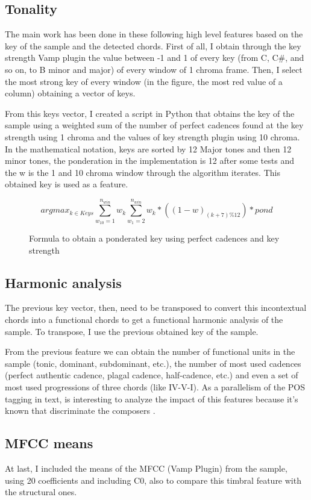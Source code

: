 \documentclass{article}
\begin{document}
\subsection{Tonality}\label{subsec:chord_windows}
The main work has been done in these following high level features based on the key of the sample and the detected chords. First of all, I obtain through the key strength Vamp plugin the value between -1 and 1 of every key (from C, C\#, and so on, to B minor and major) of every window of 1 chroma frame. Then, I select the most strong key of every window (in the figure, the most red value of a column) obtaining a vector of keys.

From this keys vector, I created a script in Python that obtains the key of the sample using a weighted sum of the number of perfect cadences found at the key strength using 1 chroma and the values of key strength plugin using 10 chroma. In the mathematical notation, keys are sorted by 12 Major tones and then 12 minor tones, the ponderation in the implementation is 12 after some tests and the w is the 1 and 10 chroma window through the algorithm iterates. This obtained key is used as a feature.

\begin{figure}
\[ argmax_{k \in Keys} \sum_{w_{10}=1}^{n_{win}} w_k \sum_{w_{1}=2}^{n_{win}} w_k * ((1-w)_{(k+7)\%12})*pond \]
\caption{Formula to obtain a ponderated key using perfect cadences and key strength} \label{fig:keyFormula}
\end{figure}


\subsection{Harmonic analysis}\label{subsec:uni_bi_tri}
The previous key vector, then, need to be transposed to convert this incontextual chords into a functional chords to get a functional harmonic analysis of the sample. To transpose, I use the previous obtained key of the sample.

From the previous feature we can obtain the number of functional units in the sample (tonic, dominant, subdominant, etc.), the number of most used cadences (perfect authentic cadence, plagal cadence, half-cadence, etc.) and even a set of most used progressions of three chords (like IV-V-I). As a parallelism of the POS tagging in text, is interesting to analyze the impact of this features because it's known that discriminate the composers \cite{desportes}.

\subsection{MFCC means}\label{subsec:mfcc_means}
At last, I included the means of the MFCC (Vamp Plugin) from the sample, using 20 coefficients and including C0, also to compare this timbral feature with the structural ones.
\end{document}
